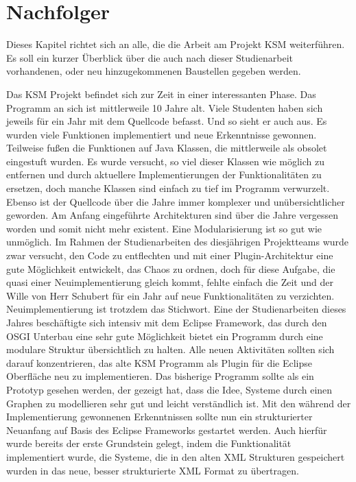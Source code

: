 \section{Nachfolger}

Dieses Kapitel richtet sich an alle, die die Arbeit am Projekt KSM weiterführen. Es soll ein kurzer Überblick über die auch nach dieser Studienarbeit vorhandenen, oder neu hinzugekommenen Baustellen gegeben werden. 

Das KSM Projekt befindet sich zur Zeit in einer interessanten Phase. Das Programm an sich ist mittlerweile 10 Jahre alt. Viele Studenten haben sich jeweils für ein Jahr mit dem Quellcode befasst. Und so sieht er auch aus. Es wurden viele Funktionen implementiert und neue Erkenntnisse gewonnen. Teilweise fußen die Funktionen auf Java Klassen, die mittlerweile als obsolet eingestuft wurden. Es wurde versucht, so viel dieser Klassen wie möglich zu entfernen und durch aktuellere Implementierungen der Funktionalitäten zu ersetzen, doch manche Klassen sind einfach zu tief im Programm verwurzelt. Ebenso ist der Quellcode über die Jahre immer komplexer und unübersichtlicher geworden. Am Anfang eingeführte Architekturen sind über die Jahre vergessen worden und somit nicht mehr existent. Eine Modularisierung ist so gut wie unmöglich. Im Rahmen der Studienarbeiten des diesjährigen Projektteams wurde zwar versucht, den Code zu entflechten und mit einer Plugin-Architektur eine gute Möglichkeit entwickelt, das Chaos zu ordnen, doch für diese Aufgabe, die quasi einer Neuimplementierung gleich kommt, fehlte einfach die Zeit und der Wille von Herr Schubert für ein Jahr auf neue Funktionalitäten zu verzichten. Neuimplementierung ist trotzdem das Stichwort. Eine der Studienarbeiten dieses Jahres beschäftigte sich intensiv mit dem Eclipse Framework, das durch den OSGI Unterbau eine sehr gute Möglichkeit bietet ein Programm durch eine modulare Struktur übersichtlich zu halten. Alle neuen Aktivitäten sollten sich darauf konzentrieren, das alte KSM Programm als Plugin für die Eclipse Oberfläche neu zu implementieren. Das bisherige Programm sollte als ein Prototyp gesehen werden, der gezeigt hat, dass die Idee, Systeme durch einen Graphen zu modellieren sehr gut und leicht verständlich ist. Mit den während der Implementierung gewonnenen Erkenntnissen sollte nun ein strukturierter Neuanfang auf Basis des Eclipse Frameworks gestartet werden. Auch hierfür wurde bereits der erste Grundstein gelegt, indem die Funktionalität implementiert wurde, die Systeme, die in den alten XML Strukturen gespeichert wurden in das neue, besser strukturierte XML Format zu übertragen.

